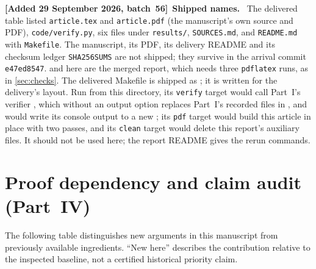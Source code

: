 \documentclass[11pt,letterpaper]{article}
\numberwithin{equation}{section}
\theoremstyle{definition}
\theoremstyle{remark}
\theoremstyle{definition}
\newenvironment{writenotec}[1][]{\par\smallskip\begingroup\small\sloppy
 \noindent\textbf{[Added 29 September 2026, batch~56]}\if\relax\detokenize{#1}\relax\else~\textbf{#1.}\fi\ }%
 {\par\endgroup\smallskip}
\begin{document}
\begin{writenotec}[Shipped names]
The delivered table listed \texttt{article.tex} and \texttt{article.pdf} (the
manuscript's own source and PDF), \texttt{code/verify.py}, six files under
\texttt{results/}, \texttt{SOURCES.md}, and \texttt{README.md} with
\texttt{Makefile}. The manuscript, its PDF, its delivery README and its
checksum ledger \texttt{SHA256SUMS} are not shipped; they survive in the
arrival commit \texttt{e47ed8547}.  and 
here are the merged report, which needs three \texttt{pdflatex} runs, as in
\cref{sec:checks}. The delivered Makefile is shipped as
; it is written for the delivery's
layout. Run from this directory, its \texttt{verify} target would call
Part~I's verifier , which without an output option
replaces Part~I's recorded files in , and would write its console
output to a new ; its \texttt{pdf} target
would build this article in place with two passes, and its \texttt{clean}
target would delete this report's auxiliary files. It should not be used here; the report README gives the rerun
commands.
\end{writenotec}

\section{Proof dependency and claim audit (Part~IV)}
\label{cw:app:audit}

The following table distinguishes new arguments in this manuscript from
previously available ingredients. ``New here'' describes the contribution
relative to the inspected baseline, not a certified historical priority claim.
\end{document}
